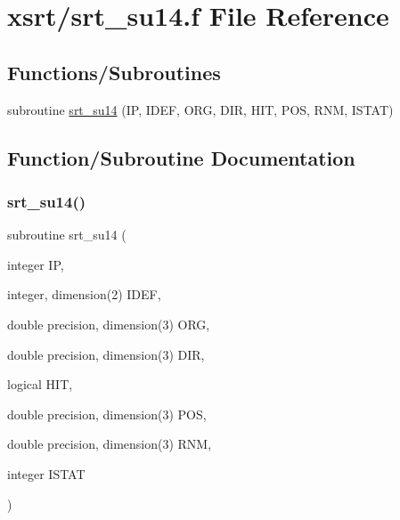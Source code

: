 \hypertarget{srt__su14_8f}{}\section{xsrt/srt\+\_\+su14.f File Reference}
\label{srt__su14_8f}
\subsection*{Functions/\+Subroutines}
\begin{DoxyCompactItemize}
\item 
subroutine \hyperlink{srt__su14_8f_a1834c5320b34e719ed1d1371d9cb5f06}{srt\+\_\+su14} (IP, I\+D\+EF, O\+RG, D\+IR, H\+IT, P\+OS, R\+NM, I\+S\+T\+AT)
\end{DoxyCompactItemize}


\subsection{Function/\+Subroutine Documentation}
\mbox{\label{srt__su14_8f_a1834c5320b34e719ed1d1371d9cb5f06}} 
\subsubsection{\texorpdfstring{srt\+\_\+su14()}{srt\_su14()}}
{\footnotesize\ttfamily subroutine srt\+\_\+su14 (\begin{DoxyParamCaption}\item[{integer}]{IP,  }\item[{integer, dimension(2)}]{I\+D\+EF,  }\item[{double precision, dimension(3)}]{O\+RG,  }\item[{double precision, dimension(3)}]{D\+IR,  }\item[{logical}]{H\+IT,  }\item[{double precision, dimension(3)}]{P\+OS,  }\item[{double precision, dimension(3)}]{R\+NM,  }\item[{integer}]{I\+S\+T\+AT }\end{DoxyParamCaption})}


